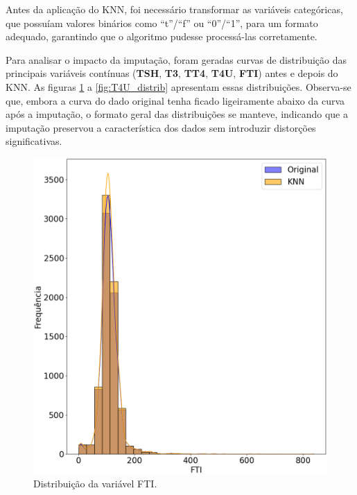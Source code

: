 \documentclass[11pt]{article}
\begin{document}
Antes da aplicação do KNN, foi necessário transformar as variáveis categóricas, que possuíam valores binários como ``t''/``f'' ou ``0''/``1'', para um formato adequado, garantindo que o algoritmo pudesse processá-las corretamente.

Para analisar o impacto da imputação, foram geradas curvas de distribuição das principais variáveis contínuas (\textbf{TSH}, \textbf{T3}, \textbf{TT4}, \textbf{T4U}, \textbf{FTI}) antes e depois do KNN. As figuras \ref{fig:FTI_distrib} a \ref{fig:T4U_distrib} apresentam essas distribuições. Observa-se que, embora a curva do dado original tenha ficado ligeiramente abaixo da curva após a imputação, o formato geral das distribuições se manteve, indicando que a imputação preservou a característica dos dados sem introduzir distorções significativas.

\begin{figure}[H]
    \centering
    \begin{minipage}{0.48\textwidth}
        \centering
        \includegraphics[width=\textwidth]{img/FTI_distrib.png}
        \caption{Distribuição da variável FTI.}
        \label{fig:FTI_distrib}
    \end{minipage}
    \hfill
    \begin{minipage}{0.48\textwidth}

\end{minipage}
\end{figure}
\end{document}
